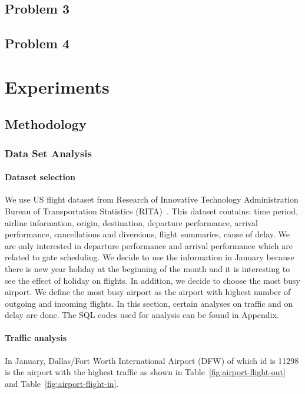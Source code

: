 \documentclass[11pt,a4paper]{article}
\begin{document}
\subsection{Problem 3}
\label{subsec:algo-prob3}

\subsection{Problem 4}
\label{subsec:algo-prob4}

\section{Experiments}
\label{sec:expe}

\subsection{Methodology}
\label{subsec:expo-meth}
\subsubsection{Data Set Analysis}
\label{subsec:expo-data}
\paragraph{Dataset selection}
We use US flight dataset from Research of Innovative Technology Administration Bureau of Transportation Statistics (RITA)~\cite{rita}. This dataset contains: time period, airline information, origin, destination, departure performance, arrival performance, cancellations and diversions, flight summaries, cause of delay. We are only interested in departure performance and arrival performance which are related to gate scheduling. We decide to use the information in January because there is new year holiday at the beginning of the month and it is interesting to see the effect of holiday on flights. In addition, we decide to choose the most busy airport. We define the most busy airport as the airport with highest number of outgoing and incoming flights. In this section, certain analyses on traffic and on delay are done. The SQL codes used for analysis can be found in Appendix.

\paragraph{Traffic analysis}
In January, Dallas/Fort Worth International Airport (DFW) of which id is 11298 is the airport with the highest traffic as shown in Table~\ref{fig:airport-flight-out} and Table~\ref{fig:airport-flight-in}.\par
\end{document}
